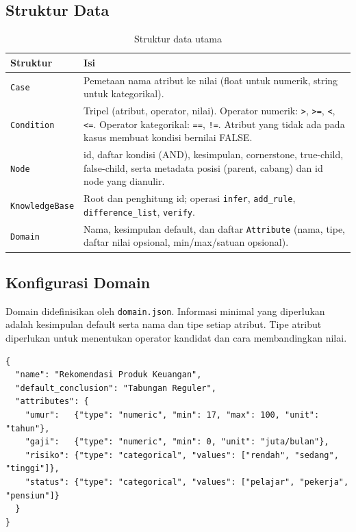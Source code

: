 \documentclass[11pt,a4paper]{article}
\newcommand{\cond}[1]{\texttt{#1}}
\begin{document}
\subsection{Struktur Data}
\begin{table}[H]
\centering
\begin{tabularx}{\textwidth}{lL}
\toprule
\textbf{Struktur} & \textbf{Isi} \\
\midrule
\texttt{Case} & Pemetaan nama atribut ke nilai (float untuk numerik, string untuk kategorikal). \\
\texttt{Condition} & Tripel (atribut, operator, nilai). Operator numerik: \cond{>}, \cond{>=},
  \cond{<}, \cond{<=}. Operator kategorikal: \cond{==}, \cond{!=}. Atribut yang tidak ada pada
  kasus membuat kondisi bernilai FALSE. \\
\texttt{Node} & id, daftar kondisi (AND), kesimpulan, cornerstone, true-child, false-child, serta
  metadata posisi (parent, cabang) dan id node yang dianulir. \\
\texttt{KnowledgeBase} & Root dan penghitung id; operasi \texttt{infer}, \texttt{add\_rule},
  \texttt{difference\_list}, \texttt{verify}. \\
\texttt{Domain} & Nama, kesimpulan default, dan daftar \texttt{Attribute} (nama, tipe, daftar
  nilai opsional, min/max/satuan opsional). \\
\bottomrule
\end{tabularx}
\caption{Struktur data utama}
\end{table}

\subsection{Konfigurasi Domain}
Domain didefinisikan oleh \texttt{domain.json}. Informasi minimal yang diperlukan adalah
kesimpulan default serta nama dan tipe setiap atribut. Tipe atribut diperlukan untuk
menentukan operator kandidat dan cara membandingkan nilai.

\begin{lstlisting}
{
  "name": "Rekomendasi Produk Keuangan",
  "default_conclusion": "Tabungan Reguler",
  "attributes": {
    "umur":   {"type": "numeric", "min": 17, "max": 100, "unit": "tahun"},
    "gaji":   {"type": "numeric", "min": 0, "unit": "juta/bulan"},
    "risiko": {"type": "categorical", "values": ["rendah", "sedang", "tinggi"]},
    "status": {"type": "categorical", "values": ["pelajar", "pekerja", "pensiun"]}
  }
}
\end{lstlisting}
\end{document}
